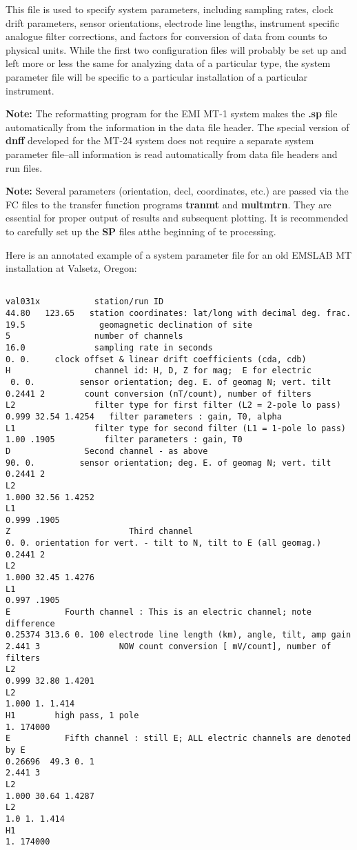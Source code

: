 This file is used to specify system parameters, including
sampling rates, clock drift parameters, sensor orientations,
electrode line lengths, instrument specific analogue filter corrections,
and factors for conversion of data from
counts to physical units.
While the first two configuration files will probably be
set up and left more or less the same for analyzing
data of a particular type, the system parameter file will be 
specific to a particular installation of a particular instrument.

{\bf Note:} The reformatting program for the EMI MT-1 system makes
the {\bf .sp} file automatically from the information in the
data file header.  The special version of {\bf dnff} developed for the MT-24
system does not require a separate system parameter file--all information
is read automatically from data file headers and run files.

{\bf Note:} Several parameters (orientation, decl, coordinates, etc.)
are passed via the FC files to 
the transfer function programs {\bf tranmt} and {\bf multmtrn}. They
are essential for proper output of results and subsequent plotting. It
is recommended to carefully set up the {\bf SP} files atthe beginning
of te processing.

Here is an annotated example of a system parameter file for an old EMSLAB
MT installation at Valsetz, Oregon:
\small

\begin{verbatim}

val031x           station/run ID
44.80   123.65   station coordinates: lat/long with decimal deg. frac.
19.5               geomagnetic declination of site
5                 number of channels
16.0              sampling rate in seconds
0. 0.     clock offset & linear drift coefficients (cda, cdb)
H                 channel id: H, D, Z for mag;  E for electric
 0. 0.         sensor orientation; deg. E. of geomag N; vert. tilt
0.2441 2        count conversion (nT/count), number of filters
L2                filter type for first filter (L2 = 2-pole lo pass)
0.999 32.54 1.4254   filter parameters : gain, T0, alpha
L1                filter type for second filter (L1 = 1-pole lo pass)
1.00 .1905          filter parameters : gain, T0
D               Second channel - as above
90. 0.         sensor orientation; deg. E. of geomag N; vert. tilt
0.2441 2
L2
1.000 32.56 1.4252
L1
0.999 .1905
Z                        Third channel
0. 0. orientation for vert. - tilt to N, tilt to E (all geomag.)
0.2441 2
L2
1.000 32.45 1.4276
L1
0.997 .1905
E           Fourth channel : This is an electric channel; note difference
0.25374 313.6 0. 100 electrode line length (km), angle, tilt, amp gain
2.441 3                NOW count conversion [ mV/count], number of filters
L2
0.999 32.80 1.4201
L2
1.000 1. 1.414
H1        high pass, 1 pole
1. 174000
E           Fifth channel : still E; ALL electric channels are denoted by E
0.26696  49.3 0. 1
2.441 3
L2
1.000 30.64 1.4287
L2
1.0 1. 1.414
H1
1. 174000
\end{verbatim}
\normalsize

